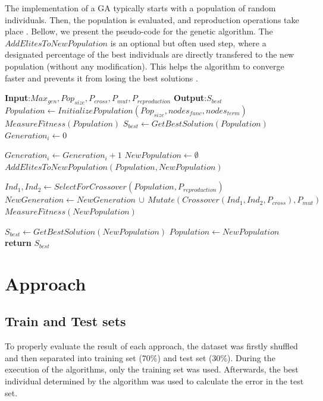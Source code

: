 \documentclass[runningheads]{llncs}
\begin{document}
The implementation of a GA typically starts with a population of random individuals. Then, the population is evaluated, and reproduction operations take place \cite{whitley1994genetic}. Bellow, we present the pseudo-code for the genetic algorithm. The $AddElitesToNewPopulation$ is an optional but often used step, where a designated percentage of the best individuals are directly transfered to the new population (without any modification). This helps the algorithm to converge faster and prevents it from losing the best solutions \cite{martins2016gacuda}.

\begin{algorithmic} \small
   \State \textbf{Input}:$Max_{gen},Pop_{size},P_{cross},P_{mut},P_{reproduction}$
   \State \textbf{Output}:$S_{best}$
   \State $Population\gets InitializePopulation(Pop_{size},nodes_{func},nodes_{term})$
   \State $MeasureFitness(Population)$ 
   \State $S_{best} \gets GetBestSolution(Population)$
   \State $Generation_{i} \gets 0$
   
      \State $Generation_{i} \gets Generation_{i} + 1$
      \State $NewPopulation \gets \emptyset$
      \State $AddElitesToNewPopulation(Population,NewPopulation)$ 
   
         \State $Ind_{1}, Ind_{2} \gets SelectForCrossover(Population, P_{reproduction})$
         \State $NewGeneration \gets NewGeneration \, \cup \, Mutate(Crossover(Ind_{1},Ind_{2},P_{cross}),P_{mut})$
         \State $MeasureFitness(NewPopulation)$
      \EndWhile
      
      \State $S_{best} \gets GetBestSolution(NewPopulation)$
      \State $Population \gets NewPopulation$
   \EndWhile
   \State \textbf{return} $S_{best}$
\end{algorithmic}

\section{Approach}

\subsection{Train and Test sets}

To properly evaluate the result of each approach, the dataset was firstly shuffled and then separated  into training set (70\%) and test set (30\%). During the execution of the algorithms, only the training set was used. Afterwards, the best individual determined by the algorithm was used to calculate the error in the test set.
\end{document}

